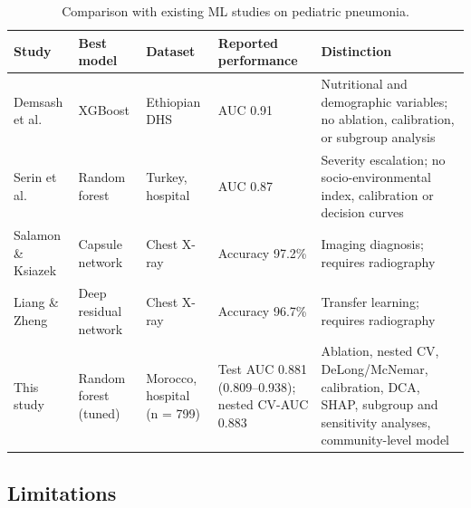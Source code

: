 \documentclass[a4paper,fleqn]{cas-dc}
\begin{document}
\begin{table}[tbp]
\caption{Comparison with existing ML studies on pediatric pneumonia.}
\label{tab:16}
\centering
{\scriptsize
\setlength{\tabcolsep}{3.2pt}
\begin{tabular}{>{\raggedright\arraybackslash}p{}>{\raggedright\arraybackslash}p{}>{\raggedright\arraybackslash}p{}>{\raggedright\arraybackslash}p{}>{\raggedright\arraybackslash}p{}}
\toprule
\textbf{Study} & \textbf{Best model} & \textbf{Dataset} & \textbf{Reported performance} & \textbf{Distinction} \\
\midrule
Demsash et al. \cite{r7} & XGBoost & Ethiopian DHS & AUC 0.91 & Nutritional and demographic variables; no ablation, calibration, or subgroup analysis \\
Serin et al. \cite{r4} & Random forest & Turkey, hospital & AUC 0.87 & Severity escalation; no socio-environmental index, calibration or decision curves \\
Salamon \& Ksiazek \cite{r11} & Capsule network & Chest X-ray & Accuracy 97.2\% & Imaging diagnosis; requires radiography \\
Liang \& Zheng \cite{r12} & Deep residual network & Chest X-ray & Accuracy 96.7\% & Transfer learning; requires radiography \\
This study & Random forest (tuned) & Morocco, hospital (n = 799) & Test AUC 0.881 (0.809--0.938); nested CV-AUC 0.883 & Ablation, nested CV, DeLong/McNemar, calibration, DCA, SHAP, subgroup and sensitivity analyses, community-level model \\
\bottomrule
\end{tabular}}
\end{table}

\subsection{Limitations}
\label{sec:lim}
\end{document}

